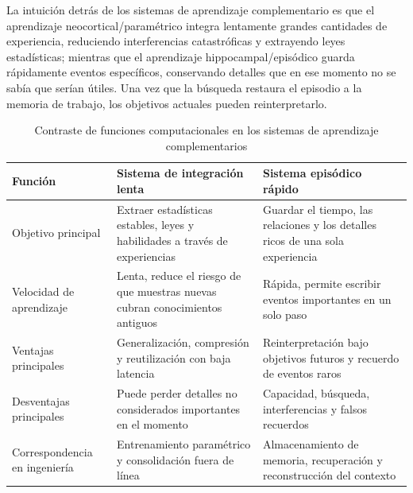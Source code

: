 La intuición detrás de los sistemas de aprendizaje complementario es que el aprendizaje neocortical/paramétrico integra lentamente grandes cantidades de experiencia, reduciendo interferencias catastróficas y extrayendo leyes estadísticas; mientras que el aprendizaje hippocampal/episódico guarda rápidamente eventos específicos, conservando detalles que en ese momento no se sabía que serían útiles. Una vez que la búsqueda restaura el episodio a la memoria de trabajo, los objetivos actuales pueden reinterpretarlo.


\begin{table}[H]
\centering
\small
\caption{Contraste de funciones computacionales en los sistemas de aprendizaje complementarios}
\begin{tabularx}{\textwidth}{L{0.22\textwidth}X X}
\toprule
Función & Sistema de integración lenta & Sistema episódico rápido \\
\midrule
Objetivo principal & Extraer estadísticas estables, leyes y habilidades a través de experiencias & Guardar el tiempo, las relaciones y los detalles ricos de una sola experiencia \\
Velocidad de aprendizaje & Lenta, reduce el riesgo de que muestras nuevas cubran conocimientos antiguos & Rápida, permite escribir eventos importantes en un solo paso \\
Ventajas principales & Generalización, compresión y reutilización con baja latencia & Reinterpretación bajo objetivos futuros y recuerdo de eventos raros \\
Desventajas principales & Puede perder detalles no considerados importantes en el momento & Capacidad, búsqueda, interferencias y falsos recuerdos \\
Correspondencia en ingeniería & Entrenamiento paramétrico y consolidación fuera de línea & Almacenamiento de memoria, recuperación y reconstrucción del contexto \\
\bottomrule
\end{tabularx}
\end{table}


